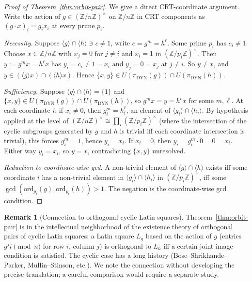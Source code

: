 \documentclass[11pt,reqno]{amsart}
\theoremstyle{plain}
\theoremstyle{definition}
\newtheorem{remark}[theorem]{Remark}
\newcommand{\Z}{\mathbb{Z}}
\newcommand{\Zn}{\Z/n\Z}
\newcommand{\Zns}{(\Z/n\Z)^{\times}}
\newcommand{\DYN}{\mathrm{DYN}}
\newcommand{\ord}{\mathrm{ord}}
\begin{document}
\begin{proof}[Proof of Theorem~\ref{thm:orbit-pair}]
We give a direct CRT-coordinate argument. Write the action of $g \in \Zns$ on $\Zn$ in CRT components as $(g \cdot x)_i = g_i x_i$ at every prime $p_i$.

\emph{Necessity.} Suppose $\langle g \rangle \cap \langle h \rangle \ni c \neq 1$, write $c = g^m = h^{\ell}$. Some prime $p_i$ has $c_i \neq 1$. Choose $x \in \Zn$ with $x_j = 0$ for $j \neq i$ and $x_i = 1$ in $(\Z/p_i\Z)^{\times}$. Then $y := g^m x = h^{\ell} x$ has $y_i = c_i \neq 1 = x_i$ and $y_j = 0 = x_j$ at $j \neq i$. So $y \neq x$, and $y \in (\langle g \rangle x) \cap (\langle h \rangle x)$. Hence $\{x, y\} \in U(\pi_{\DYN}(g)) \cap U(\pi_{\DYN}(h))$.

\emph{Sufficiency.} Suppose $\langle g \rangle \cap \langle h \rangle = \{1\}$ and $\{x, y\} \in U(\pi_{\DYN}(g)) \cap U(\pi_{\DYN}(h))$, so $g^m x = y = h^{\ell} x$ for some $m, \ell$. At each coordinate $i$: if $x_i \neq 0$, then $g_i^m = h_i^{\ell}$, an element of $\langle g_i \rangle \cap \langle h_i \rangle$. By hypothesis applied at the level of $\Zns \cong \prod_i (\Z/p_i\Z)^{\times}$ (where the intersection of the cyclic subgroups generated by $g$ and $h$ is trivial iff each coordinate intersection is trivial), this forces $g_i^m = 1$, hence $y_i = x_i$. If $x_i = 0$, then $y_i = g_i^m \cdot 0 = 0 = x_i$. Either way $y_i = x_i$, so $y = x$, contradicting $\{x, y\}$ unresolved.

\emph{Reduction to coordinate-wise gcd.} A non-trivial element of $\langle g \rangle \cap \langle h \rangle$ exists iff some coordinate $i$ has a non-trivial element in $\langle g_i \rangle \cap \langle h_i \rangle$ in $(\Z/p_i\Z)^{\times}$, iff some $\gcd(\ord_{p_i}(g), \ord_{p_i}(h)) > 1$. The negation is the coordinate-wise gcd condition.
\end{proof}

\begin{remark}[Connection to orthogonal cyclic Latin squares]
Theorem~\ref{thm:orbit-pair} is in the intellectual neighborhood of the existence theory of orthogonal pairs of cyclic Latin squares: a Latin square $L_g$ based on the action of $g$ (entries $g^j i \pmod n$ for row $i$, column $j$) is orthogonal to $L_h$ iff a certain joint-image condition is satisfied. The cyclic case has a long history (Bose--Shrikhande--Parker, Mullin--Stinson, etc.). We note the connection without developing the precise translation; a careful comparison would require a separate study.
\end{remark}
\end{document}
